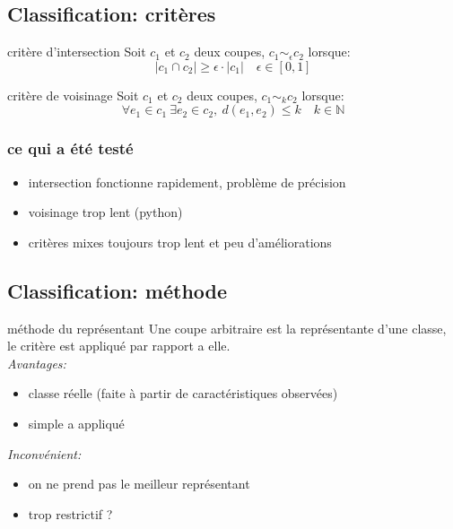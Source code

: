 \documentclass[aspectratio=169]{beamer}
\newcommand{\N}{\mathbb{N}}
\begin{document}
    \subsection{Classification: critères}
    \begin{frame}{critère d'intersection}
        Soit $c_1$ et $c_2$ deux coupes, $c_1 \sim_\epsilon c_2$ lorsque:
        $$|c_1 \cap c_2| \geq \epsilon \cdot |c_1|\quad\epsilon\in [0, 1]$$
    \end{frame}
    \begin{frame}{critère de voisinage}
        Soit $c_1$ et $c_2$ deux coupes, $c_1 \sim_k c_2$ lorsque:
        $$\forall e_1\in c_1\ \exists e_2\in c_2,\ d(e_1, e_2)\leq k\quad k\in\N$$
    \end{frame}
    \begin{frame}
        \frametitle{ce qui a été testé}
        \begin{itemize}
            \item intersection fonctionne rapidement, problème de précision
            \item voisinage trop lent (python)
            \item critères mixes toujours trop lent et peu d'améliorations
        \end{itemize}
    \end{frame}

    \subsection{Classification: méthode}
    \begin{frame}{méthode du représentant}
        Une coupe arbitraire est la représentante d'une classe, le critère est appliqué par rapport a elle.\\
        \vspace*{5pt}
        \emph{Avantages:}
        \begin{itemize}
            \item classe réelle (faite à partir de caractéristiques observées)
            \item simple a appliqué
        \end{itemize}
        \emph{Inconvénient:}
        \begin{itemize}
            \item on ne prend pas le meilleur représentant
            \item trop restrictif ?
        \end{itemize}
    \end{frame}
\end{document}
